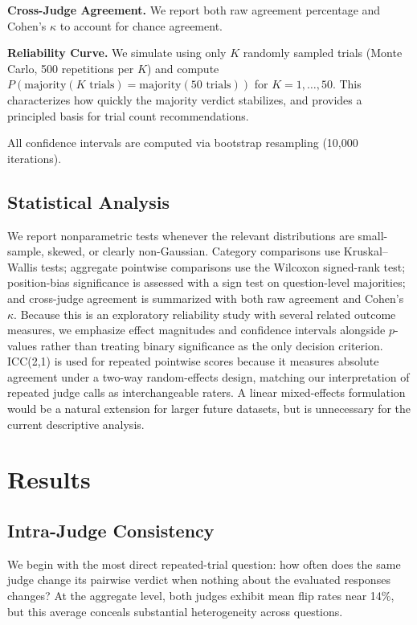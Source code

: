 \documentclass{ijclclp}
\begin{document}
\textbf{Cross-Judge Agreement.} We report both raw agreement percentage and Cohen's $\kappa$ to account for chance agreement.

\textbf{Reliability Curve.} We simulate using only $K$ randomly sampled trials (Monte Carlo, 500 repetitions per $K$) and compute $P(\text{majority}(K\text{ trials}) = \text{majority}(50\text{ trials}))$ for $K = 1, \ldots, 50$. This characterizes how quickly the majority verdict stabilizes, and provides a principled basis for trial count recommendations.

All confidence intervals are computed via bootstrap resampling (10,000 iterations).

\subsection{Statistical Analysis}

We report nonparametric tests whenever the relevant distributions are small-sample, skewed, or clearly non-Gaussian. Category comparisons use Kruskal--Wallis tests; aggregate pointwise comparisons use the Wilcoxon signed-rank test; position-bias significance is assessed with a sign test on question-level majorities; and cross-judge agreement is summarized with both raw agreement and Cohen's $\kappa$. Because this is an exploratory reliability study with several related outcome measures, we emphasize effect magnitudes and confidence intervals alongside $p$-values rather than treating binary significance as the only decision criterion. ICC(2,1) is used for repeated pointwise scores because it measures absolute agreement under a two-way random-effects design, matching our interpretation of repeated judge calls as interchangeable raters. A linear mixed-effects formulation would be a natural extension for larger future datasets, but is unnecessary for the current descriptive analysis.

\section{Results}

\subsection{Intra-Judge Consistency}

We begin with the most direct repeated-trial question: how often does the same judge change its pairwise verdict when nothing about the evaluated responses changes? At the aggregate level, both judges exhibit mean flip rates near 14\%, but this average conceals substantial heterogeneity across questions.
\end{document}
